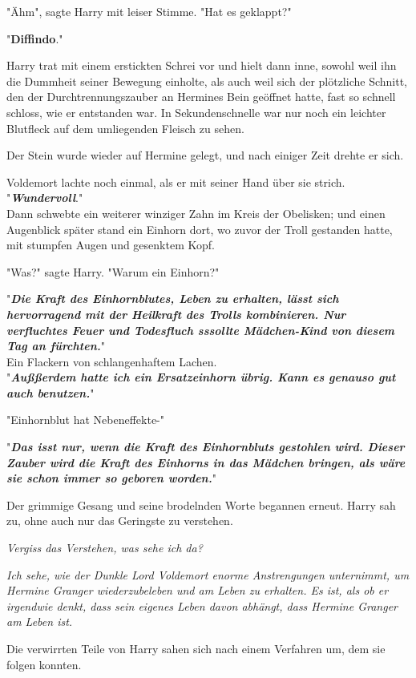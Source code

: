{"Ähm", sagte Harry mit leiser Stimme. "Hat es geklappt?"

"\textbf{Diffindo}."

Harry trat mit einem erstickten Schrei vor und hielt dann inne, sowohl weil ihn die Dummheit seiner Bewegung einholte, als auch weil sich der plötzliche Schnitt, den der Durchtrennungszauber an Hermines Bein geöffnet hatte, fast so schnell schloss, wie er entstanden war. In Sekundenschnelle war nur noch ein leichter Blutfleck auf dem umliegenden Fleisch zu sehen.

Der Stein wurde wieder auf Hermine gelegt, und nach einiger Zeit drehte er sich.

Voldemort lachte noch einmal, als er mit seiner Hand über sie strich.\\ "\textbf{\emph{Wundervoll}}."\\ Dann schwebte ein weiterer winziger Zahn im Kreis der Obelisken; und einen Augenblick später stand ein Einhorn dort, wo zuvor der Troll gestanden hatte, mit stumpfen Augen und gesenktem Kopf.

"Was?" sagte Harry. "Warum ein Einhorn?"

"\textbf{\emph{Die Kraft des Einhornblutes, Leben zu erhalten, lässt sich hervorragend mit der Heilkraft des Trolls kombinieren. Nur verfluchtes Feuer und Todesfluch sssollte Mädchen-Kind von diesem Tag an fürchten.}}"\\ Ein Flackern von schlangenhaftem Lachen.\\ "\textbf{\emph{Außßerdem hatte ich ein Ersatzeinhorn übrig. Kann es genauso gut auch benutzen.}}"

"Einhornblut hat Nebeneffekte-"

"\textbf{\emph{Das isst nur, wenn die Kraft des Einhornbluts gestohlen wird. Dieser Zauber wird die Kraft des Einhorns in das Mädchen bringen, als wäre sie schon immer so geboren worden.}}"

Der grimmige Gesang und seine brodelnden Worte begannen erneut. Harry sah zu, ohne auch nur das Geringste zu verstehen.

\emph{Vergiss das Verstehen, was sehe ich da?}

\emph{Ich sehe, wie der Dunkle Lord Voldemort enorme Anstrengungen unternimmt, um Hermine Granger wiederzubeleben und am Leben zu erhalten. Es ist, als ob er irgendwie denkt, dass sein eigenes Leben davon abhängt, dass Hermine Granger am Leben ist.}

Die verwirrten Teile von Harry sahen sich nach einem Verfahren um, dem sie folgen konnten.

}
